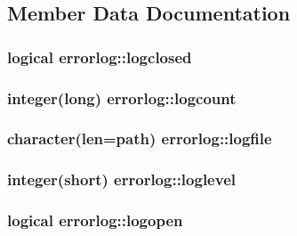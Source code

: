 \subsection{Member Data Documentation}
\hypertarget{classerrorlog_af9add736038cc71b13ee19df6544f3e5}{
\subsubsection[{logclosed}]{\setlength{\rightskip}{0pt plus 5cm}logical errorlog\-::logclosed\hspace{0.3cm}{\ttfamily [private]}}}\label{classerrorlog_af9add736038cc71b13ee19df6544f3e5}
\hypertarget{classerrorlog_a056ccc9457985050fb6391dd4abf1f2c}{
\subsubsection[{logcount}]{\setlength{\rightskip}{0pt plus 5cm}integer(long) errorlog\-::logcount\hspace{0.3cm}{\ttfamily [private]}}}\label{classerrorlog_a056ccc9457985050fb6391dd4abf1f2c}
\hypertarget{classerrorlog_a42e82497abf38d3e1683b51b48a5e4c0}{
\subsubsection[{logfile}]{\setlength{\rightskip}{0pt plus 5cm}character(len=path) errorlog\-::logfile\hspace{0.3cm}{\ttfamily [private]}}}\label{classerrorlog_a42e82497abf38d3e1683b51b48a5e4c0}
\hypertarget{classerrorlog_a3ab7fc512e499660dcb9a9542aab02b5}{
\subsubsection[{loglevel}]{\setlength{\rightskip}{0pt plus 5cm}integer(short) errorlog\-::loglevel\hspace{0.3cm}{\ttfamily [private]}}}\label{classerrorlog_a3ab7fc512e499660dcb9a9542aab02b5}
\hypertarget{classerrorlog_a3a12f9c3cbb079a8cbb7b5790ea2c827}{
\subsubsection[{logopen}]{\setlength{\rightskip}{0pt plus 5cm}logical errorlog\-::logopen\hspace{0.3cm}{\ttfamily [private]}}}\label{classerrorlog_a3a12f9c3cbb079a8cbb7b5790ea2c827}
